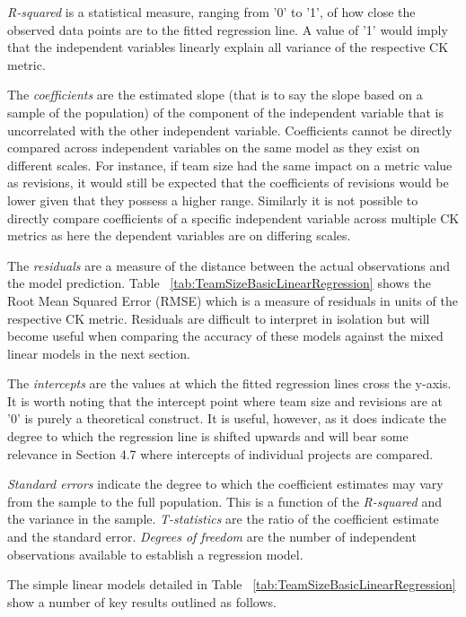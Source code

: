 \textit{R-squared} is a statistical measure, ranging from '0' to '1', of how close the observed data points are to the fitted regression line. A value of '1' would imply that the independent variables linearly explain all variance of the respective CK metric.

The \textit{coefficients} are the estimated slope (that is to say the slope based on a sample of the population) of the component of the independent variable that is uncorrelated with the other independent variable. Coefficients cannot be directly compared across independent variables on the same model as they exist on different scales. For instance, if team size had the same impact on a metric value as revisions, it would still be expected that the coefficients of revisions would be lower given that they possess a higher range. Similarly it is not possible to directly compare coefficients of a specific independent variable across multiple CK metrics as here the dependent variables are on differing scales.

The \textit{residuals} are a measure of the distance between the actual observations and the model prediction. Table ~\ref{tab:TeamSizeBasicLinearRegression} shows the Root Mean Squared Error (RMSE) which is a measure of residuals in units of the respective CK metric. Residuals are difficult to interpret in isolation but will become useful when comparing the accuracy of these models against the mixed linear models in the next section.

The \textit{intercepts} are the values at which the fitted regression lines cross the y-axis. It is worth noting that the intercept point where team size and revisions are at '0' is purely a theoretical construct. It is useful, however, as it does indicate the degree to which the regression line is shifted upwards and will bear some relevance in Section 4.7 where intercepts of individual projects are compared.

\textit{Standard errors} indicate the degree to which the coefficient estimates may vary from the sample to the full population. This is a function of the \textit{R-squared} and the variance in the sample. \textit{T-statistics} are the ratio of the coefficient estimate and the standard error.  \textit{Degrees of freedom} are the number of independent observations available to establish a regression model.

The simple linear models detailed in Table ~\ref{tab:TeamSizeBasicLinearRegression} show a number of key results outlined as follows.

